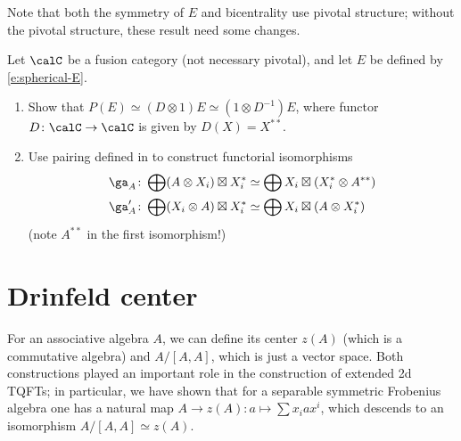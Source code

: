Note that both the symmetry of $E$ and bicentrality use pivotal structure;
 without the pivotal structure, these result need some changes.
\begin{exercise}\label{ec:E-nonpivotal}
  Let  $\calC$ be a fusion category (not necessary pivotal), and let $E$ be
  defined by \eqref{e:spherical-E}.
  \begin{enumerate}
    \item Show that $P(E)\simeq (D \otimes 1)E \simeq (1\otimes D^{-1})E$,
      where functor $D\colon  \calC\to\calC$ is given by $D(X)=X^{**}$.
    \item Use pairing defined in  to construct
      functorial isomorphisms
    \begin{align*}
      \ga_A\colon \bigoplus (A\otimes X_i) \boxtimes X_i^* &\simeq
        \bigoplus X_i \boxtimes (X_i^* \otimes A^{**})\\
      \ga'_A\colon \bigoplus (X_i\otimes A) \boxtimes X_i^* &\simeq
          \bigoplus X_i \boxtimes (A\otimes X_i^*)
    \end{align*}
    (note $A^{**}$ in the first isomorphism!)
  \end{enumerate}
\end{exercise}
\section{Drinfeld center}\label{s:drinfeld-center}
For an associative algebra $A$, we can define its center $z(A)$ (which is a
commutative algebra) and $A/[A,A]$, which is just a vector space. Both
constructions played an important role in the construction of extended 2d TQFTs; in
particular, we have shown that for a separable symmetric Frobenius algebra one
has a natural map $A\to z(A)\colon a\mapsto \sum x_iax^i$, which descends to an
isomorphism $A/[A,A]\simeq z(A)$.


